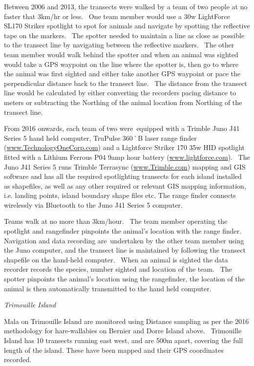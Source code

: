 \documentclass[version=last,
    paper=a4,                               %
    10pt,                                   %
    dvipsnames,
    oneside,                              %
    headings=openany,                       %
    open=any,
    BCOR=7mm,                               %
    DIV=15,     %
]{scrbook}
\begin{document}
Between 2006 and 2013, the transects were walked by a team of two people
at no faster that 3km/hr or less.~ One team member would use a 30w
LightForce SL170 Striker spotlight to spot for animals and navigate by
spotting the reflective tape on the markers.~ The spotter needed to
maintain a line as close as possible to the transect line by navigating
between the reflective markers.~ The other team member would walk behind
the spotter and when an animal was sighted would take a GPS waypoint on
the line where the spotter is, then go to where the animal was first
sighted and either take another GPS waypoint or pace the perpendicular
distance back to the transect line.~ The distance from the transect line
would be calculated by either converting the recorders pacing distance
to meters or subtracting the Northing of the animal location from
Northing of the transect line.

From 2016 onwards, each team of two were~equipped with a Trimble Juno
J41 Series 5 hand held computer, TruPulse 360˚B laser range finder
(\href{http://www.technologyonecorp.com/}{www.TechnologyOneCorp.com})
and a Lightforce Striker 170 35w HID spotlight fitted with a Lithium
Ferrous P04 9amp hour battery
(\href{http://www.lightforce.com}{www.lightforce.com}).~ The Juno J41
Series 5 runs Trimble Terrasync
(\href{http://www.Trimble.com}{www.Trimble.com}) mapping and GIS
software and has all the required spotlighting transects for each island
installed as shapefiles, as well as any other required or relevant GIS
mapping information, i.e. landing points, island boundary shape files
etc. The range finder connects wirelessly via Bluetooth to the Juno J41
Series 5 computer.

Teams walk at no more than 3km/hour.~ The team member operating the
spotlight and rangefinder pinpoints the animal's location with the range
finder.~ Navigation and data recording are~undertaken by the other team
member using the Juno computer, and the transect line is maintained by
following the transect shapefile on the hand-held computer.~ When an
animal is sighted the data recorder records the species, number sighted
and location of the team.~ The spotter pinpoints the animal's location
using the rangefinder, the location of the animal is then automatically
transmitted to the hand held computer.

\emph{Trimouille Island}

Mala on Trimouille Island are monitored using Distance sampling as per
the 2016 methodology for hare-wallabies on Bernier and Dorre Island
above.~ Trimouille Island has 10 transects running east west, and are
500m apart, covering the full length of the island. These have been
mapped and their GPS coordinates recorded.
\end{document}
